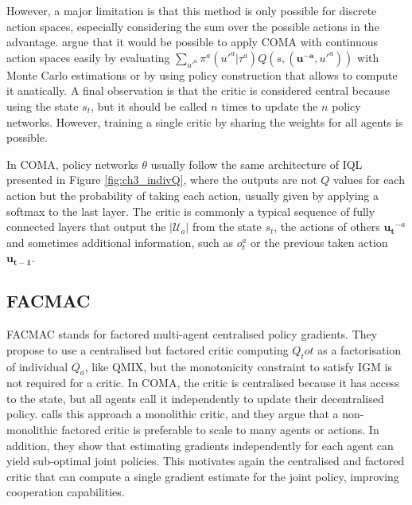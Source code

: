 However, a major limitation is that this method is only possible for discrete action spaces, especially considering the sum over the possible actions in the advantage.
\cite{foerster2017coma} argue that it would be possible to apply COMA with continuous action spaces easily by evaluating $\sum_{u'^{a}} \pi^a(u'^{a}|\tau^a) Q(s,(\mathbf{u^{-a}},u'^{a}))$ with Monte Carlo estimations or by using policy construction that allows to compute it anatically.
A final observation is that the critic is considered central because using the state $s_t$, but it should be called $n$ times to update the $n$ policy networks.
However, training a single critic by sharing the weights for all agents is possible.

In COMA, policy networks $\theta$ usually follow the same architecture of IQL presented in Figure \ref{fig:ch3_indivQ}, where the outputs are not $Q$ values for each action but the probability of taking each action, usually given by applying a softmax to the last layer.
The critic is commonly a typical sequence of fully connected layers that output the $|\mathcal{U}_a|$ from the state $s_t$, the actions of others $\boldsymbol{u_t}^{-a}$ and sometimes additional information, such as $o_t^a$ or the previous taken action $\boldsymbol{u_{t-1}}$.

\subsection{FACMAC}

FACMAC \citep{peng2021facmac} stands for factored multi-agent centralised policy gradients.
They propose to use a centralised but factored critic computing $Q_tot$ as a factorisation of individual $Q_a$, like QMIX, but the monotonicity constraint to satisfy IGM is not required for a critic.
In COMA, the critic is centralised because it has access to the state, but all agents call it independently to update their decentralised policy.
\cite{peng2021facmac} calls this approach a monolithic critic, and they argue that a non-monolithic factored critic is preferable to scale to many agents or actions.
In addition, they show that estimating gradients independently for each agent can yield sub-optimal joint policies.
This motivates again the centralised and factored critic that can compute a single gradient estimate for the joint policy, improving cooperation capabilities.

